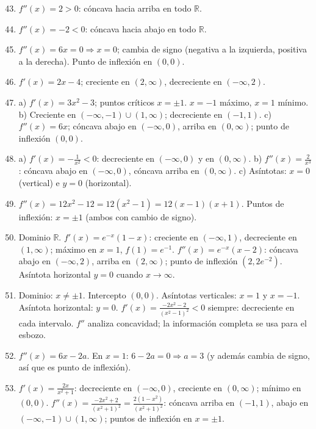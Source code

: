 \documentclass[12pt, a4paper]{article}
\begin{document}
\begin{enumerate}[leftmargin=*, label=\textbf{\arabic*.}]
  \setcounter{enumi}{42}
  \item $f''(x) = 2 > 0$: cóncava hacia arriba en todo $\mathbb{R}$.
  \item $f''(x) = -2 < 0$: cóncava hacia abajo en todo $\mathbb{R}$.
  \item $f''(x) = 6x = 0 \Rightarrow x = 0$; cambia de signo (negativa a la izquierda, positiva a la derecha). Punto de inflexión en $(0, 0)$.
  \item $f'(x) = 2x - 4$; creciente en $(2, \infty)$, decreciente en $(-\infty, 2)$.
  \item a) $f'(x) = 3x^2 - 3$; puntos críticos $x = \pm 1$. $x = -1$ máximo, $x = 1$ mínimo. b) Creciente en $(-\infty, -1) \cup (1, \infty)$; decreciente en $(-1, 1)$. c) $f''(x) = 6x$; cóncava abajo en $(-\infty, 0)$, arriba en $(0, \infty)$; punto de inflexión $(0, 0)$.
  \item a) $f'(x) = -\frac{1}{x^2} < 0$: decreciente en $(-\infty, 0)$ y en $(0, \infty)$. b) $f''(x) = \frac{2}{x^3}$: cóncava abajo en $(-\infty, 0)$, cóncava arriba en $(0, \infty)$. c) Asíntotas: $x = 0$ (vertical) e $y = 0$ (horizontal).
  \item $f''(x) = 12x^2 - 12 = 12(x^2 - 1) = 12(x - 1)(x + 1)$. Puntos de inflexión: $x = \pm 1$ (ambos con cambio de signo).
  \item Dominio $\mathbb{R}$. $f'(x) = e^{-x}(1 - x)$: creciente en $(-\infty, 1)$, decreciente en $(1, \infty)$; máximo en $x = 1$, $f(1) = e^{-1}$. $f''(x) = e^{-x}(x - 2)$: cóncava abajo en $(-\infty, 2)$, arriba en $(2, \infty)$; punto de inflexión $(2, 2e^{-2})$. Asíntota horizontal $y = 0$ cuando $x \to \infty$.
  \item Dominio: $x \neq \pm 1$. Intercepto $(0, 0)$. Asíntotas verticales: $x = 1$ y $x = -1$. Asíntota horizontal: $y = 0$. $f'(x) = \frac{-2x^2 - 2}{(x^2 - 1)^2} < 0$ siempre: decreciente en cada intervalo. $f''$ analiza concavidad; la información completa se usa para el esbozo.
  \item $f''(x) = 6x - 2a$. En $x = 1$: $6 - 2a = 0 \Rightarrow a = 3$ (y además cambia de signo, así que es punto de inflexión).
  \item $f'(x) = \frac{2x}{x^2 + 1}$: decreciente en $(-\infty, 0)$, creciente en $(0, \infty)$; mínimo en $(0, 0)$. $f''(x) = \frac{-2x^2 + 2}{(x^2 + 1)^2} = \frac{2(1 - x^2)}{(x^2 + 1)^2}$: cóncava arriba en $(-1, 1)$, abajo en $(-\infty, -1) \cup (1, \infty)$; puntos de inflexión en $x = \pm 1$.
\end{enumerate}
\end{document}
